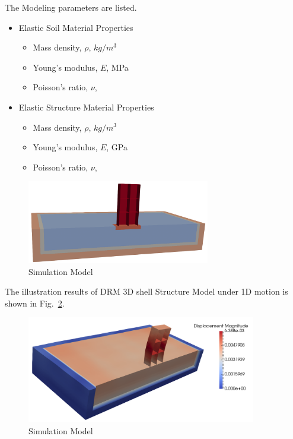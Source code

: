 The Modeling parameters are listed.
\begin{itemize}
  \item Elastic Soil Material Properties 
  \begin{itemize}
    \item Mass density, $\rho$, \enspace {} $kg/m^3$
    \item Young's modulus, $E$, \enspace {} MPa
    \item Poisson's ratio, $\nu$, \enspace {}
  \end{itemize}
  \item Elastic Structure Material Properties 
  \begin{itemize}
    \item Mass density, $\rho$, \enspace {} $kg/m^3$
    \item Young's modulus, $E$, \enspace {} GPa
    \item Poisson's ratio, $\nu$, \enspace {}
  \end{itemize}
\end{itemize}

\begin{figure}[H]
  \centering
  \includegraphics[width = 8cm]{./Figure-files/Day2/Deconvolution_3by1D_Motions/Shell_Structure_Soil_Interaction_3D_DRM/overview.png}
  \caption{Simulation Model}
  \label{fig_decon_3by1D_motion_3D_model_shell}
\end{figure}


The illustration results of DRM 3D shell Structure Model under 1D motion is shown 
in Fig.~\ref{fig_decon_3by1D_motion_3D_model_solid_shell_structure}. 

\begin{figure}[H]
  \centering
  \includegraphics[width = 10cm]{./Figure-files/Day2/Deconvolution_3by1D_Motions/Shell_Structure_Soil_Interaction_3D_DRM/DRM3D_motion3D_shell.png}
  \caption{Simulation Model}
  \label{fig_decon_3by1D_motion_3D_model_solid_shell_structure}
\end{figure}


















